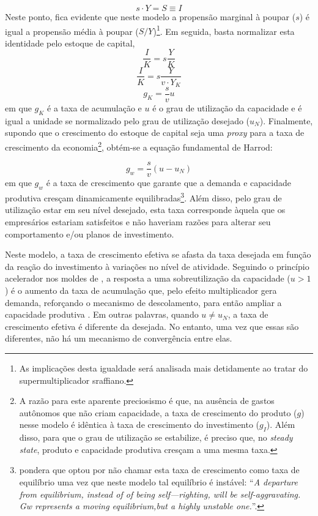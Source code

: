 $$
s\cdot Y = S \equiv I
$$
Neste ponto, fica evidente que neste modelo a propensão marginal à poupar ($s$) é igual a propensão média à poupar ($S/Y$)\footnote{As implicações desta igualdade será analisada mais detidamente ao tratar do supermultiplicador sraffiano.}. Em seguida, basta normalizar esta identidade pelo estoque de capital,
$$
\frac{I}{K} = s\frac{Y}{K}
$$
$$
\frac{I}{K} = s\frac{Y}{v\cdot Y_K}
$$
\begin{equation}
    g_K = \frac{s}{v}u
\end{equation}
em que $g_K$ é a taxa de acumulação e $u$ é o grau de utilização da capacidade e é igual a unidade se normalizado pelo grau de utilização desejado ($u_N$). Finalmente, supondo que o crescimento do estoque de capital seja uma \textit{proxy} para a taxa de crescimento da economia\footnote{A razão para este aparente preciosismo é que, na ausência de gastos autônomos que não criam capacidade, a taxa de crescimento do produto ($g$) nesse modelo é idêntica à taxa de crescimento do investimento ($g_I$). Além disso, para que o grau de utilização se estabilize, é preciso que, no \textit{steady state}, produto e capacidade produtiva cresçam a uma mesma taxa.}, obtém-se a equação fundamental de Harrod:

\begin{equation}
    \label{Fundamental}
    g_w = \frac{s}{v}(u - u_N)
\end{equation}
em que $g_w$ é a taxa de crescimento que garante que a demanda e capacidade produtiva cresçam dinamicamente equilibradas\footnote{\textcite[p,~22]{harrod_essay_1939} pondera que  optou por não chamar esta taxa de crescimento como taxa de equilíbrio uma vez que neste modelo tal equilíbrio é instável: ``\textit{A departure from equilibrium, instead of of being self—righting, will be self-aggravating. Gw represents a moving equilibrium,but a highly unstable one.}''.}. Além disso, pelo grau de utilização estar em seu nível desejado, esta taxa corresponde àquela que os empresários estariam satisfeitos e não haveriam razões para alterar seu comportamento e/ou planos de investimento. 

Neste modelo, a taxa de crescimento efetiva se afasta da taxa desejada em função da reação do investimento à variações no nível de atividade. Seguindo o princípio acelerador nos moldes de \textcite{harrod_essay_1939}, a resposta a uma sobreutilização da capacidade ($u>1$) é o aumento da taxa de acumulação que, pelo efeito multiplicador gera  demanda, reforçando o mecanismo de descolamento, para então ampliar a capacidade produtiva \cite[p.~12]{serrano_trouble_2017}. Em outras palavras, quando $u\neq u_N$,  a taxa de crescimento efetiva é diferente da desejada. No entanto, uma vez que essas são diferentes, não há um mecanismo de convergência entre elas.


